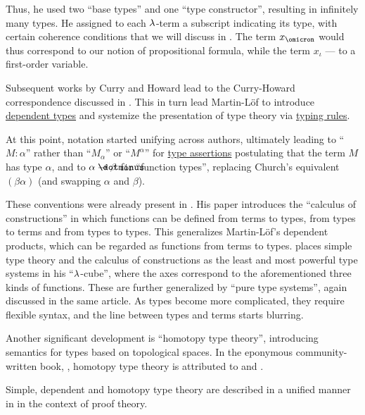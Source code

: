 \begin{remark}
  Thus, he used two \enquote{base types} and one \enquote{type constructor}, resulting in infinitely many types. He assigned to each \( \mathrm{\lambda} \)-term a subscript indicating its type, with certain coherence conditions that we will discuss in . The term \( x_\omicron \) would thus correspond to our notion of propositional formula, while the term \( x_\iota \) --- to a first-order variable.

  Subsequent works by Curry and Howard lead to the Curry-Howard correspondence discussed in . This in turn lead Martin-Löf to introduce \hyperref[rem:dependent_type]{dependent types} and systemize the presentation of type theory via \hyperref[def:typing_rule]{typing rules}.

  At this point, notation started unifying across authors, ultimately leading to \enquote{\( M: \alpha \)} rather than \enquote{\( M_\alpha \)} or \enquote{\( M^\alpha \)} for \hyperref[def:type_assertion]{type assertions} postulating that the term \( M \) has type \( \alpha \), and to \( \alpha \synimplies \beta \) for \enquote{function types}, replacing Church's equivalent \( (\beta\alpha) \) (and swapping \( \alpha \) and \( \beta \)).

  These conventions were already present in . His paper introduces the \enquote{calculus of constructions} in which functions can be defined from terms to types, from types to terms and from types to types. This generalizes Martin-L\"of's dependent products, which can be regarded as functions from terms to types.  places simple type theory and the calculus of constructions as the least and most powerful type systems in his \enquote{\( \mathrm{\lambda} \)-cube}, where the axes correspond to the aforementioned three kinds of functions. These are further generalized by \enquote{pure type systems}, again discussed in the same article. As types become more complicated, they require flexible syntax, and the line between types and terms starts blurring.

  Another significant development is \enquote{homotopy type theory}, introducing semantics for types based on topological spaces. In the eponymous community-written book, \cite{UnivalentProject2024OctoberHoTT}, homotopy type theory is attributed to \cite{Voevodski2006HoTT} and \cite{AwodeyWarren2009HoTT}.

  Simple, dependent and homotopy type theory are described in a unified manner in \cite{Mimram2020Types} in the context of proof theory.
\end{remark}

